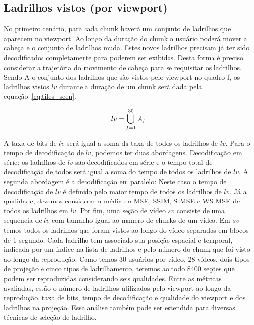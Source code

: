 \subsection{Ladrilhos vistos (por viewport)}

No primeiro cenário, para cada chunk haverá um conjunto de ladrilhos que aparecem no viewport. Ao longo da duração do chunk o usuário poderá mover a cabeça e o conjunto de ladrilhos muda. Estes novos ladrilhos precisam já ter sido decodificados completamente para poderem ser exibidos. Desta forma é preciso considerar a trajetória do movimento de cabeça para se requisitar os ladrilhos. Sendo A o conjunto dos ladrilhos que são vistos pelo viewport no quadro f, os ladrilhos vistos $lv$ durante a duração de um chunk será dada pela equação~\ref{eq:tiles_seen}.

\begin{equation}
    lv=\bigcup^{30}_{f=1} A_f \\    
    \label{eq:tiles_seen}
\end{equation}

A taxa de bits de $lv$ será igual a soma da taxa de todos os ladrilhos de $lv$. Para o tempo de decodificação de $lv$, podemos ter duas abordagens. Decodificação em série: os ladrilhos de $lv$ são decodificados em série e o tempo total de decodificação de todos será igual a soma do tempo de todos os ladrilhos de $lv$. A segunda abordagem é a decodificação em paralelo: Neste caso o tempo de decodificação de $lv$ é definido pelo maior tempo de todos os ladrilhos de $lv$. Já a qualidade, devemos considerar a média do MSE, SSIM, S-MSE e WS-MSE de todos os ladrilhos em $lv$. Por fim, uma seção de vídeo $sv$ consiste de uma sequencia de $lv$ com tamanho igual ao numero de chunks de um vídeo. Em $sv$ temos todos os ladrilhos que foram vistos ao longo do vídeo separados em blocos de 1 segundo. Cada ladrilho tem associado sua posição espacial e temporal, indicada por um índice na lista de ladrilhos e pelo número do chunk que foi visto ao longo da reprodução. Como temos 30 usuários por vídeo, 28 vídeos, dois tipos de projeção e cinco tipos de ladrilhamento, teremos ao todo 8400 seções que podem ser reproduzidas considerando seis qualidades. Entre as métricas avaliadas, estão o número de ladrilhos utilizados pelo viewport ao longo da reprodução, taxa de bits, tempo de decodificação e qualidade do viewport e dos ladrilhos na projeção. Essa análise também pode ser estendida para diversas técnicas de seleção de ladrilho.

